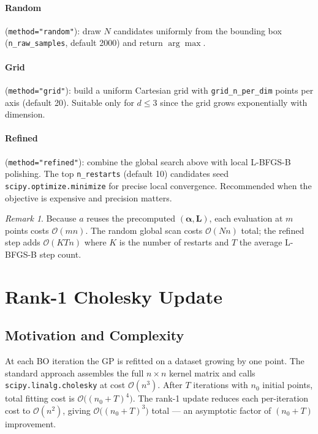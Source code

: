 \documentclass[11pt,a4paper]{article}
\newcommand{\bL}{\bm{L}}
\newcommand{\balpha}{\bm{\alpha}}
\theoremstyle{remark}
\newtheorem{remark}{Remark}
\begin{document}
\paragraph{Random} (\texttt{method="random"}): draw $N$ candidates uniformly
from the bounding box (\texttt{n\_raw\_samples}, default 2000) and return
$\arg\max$.

\paragraph{Grid} (\texttt{method="grid"}): build a uniform Cartesian grid with
\texttt{grid\_n\_per\_dim} points per axis (default 20).  Suitable only for
$d \leq 3$ since the grid grows exponentially with dimension.

\paragraph{Refined} (\texttt{method="refined"}): combine the global search
above with local L-BFGS-B polishing.  The top \texttt{n\_restarts} (default 10)
candidates seed \texttt{scipy.optimize.minimize} for precise local convergence.
Recommended when the objective is expensive and precision matters.

\begin{remark}
Because $a$ reuses the precomputed $(\balpha, \bL)$, each evaluation at $m$
points costs $\mathcal{O}(mn)$.  The random global scan costs $\mathcal{O}(Nn)$
total; the refined step adds $\mathcal{O}(K T n)$ where $K$ is the number
of restarts and $T$ the average L-BFGS-B step count.
\end{remark}

\section{Rank-1 Cholesky Update}
\label{sec:rank1}

\subsection{Motivation and Complexity}

At each BO iteration the GP is refitted on a dataset growing by one point.
The standard approach assembles the full $n\times n$ kernel matrix and calls
\texttt{scipy.linalg.cholesky} at cost $\mathcal{O}(n^3)$.  After $T$
iterations with $n_0$ initial points, total fitting cost is
$\mathcal{O}\bigl((n_0+T)^4\bigr)$.  The rank-1 update reduces each
per-iteration cost to $\mathcal{O}(n^2)$, giving
$\mathcal{O}\bigl((n_0+T)^3\bigr)$ total --- an asymptotic factor of
$(n_0+T)$ improvement.
\end{document}

